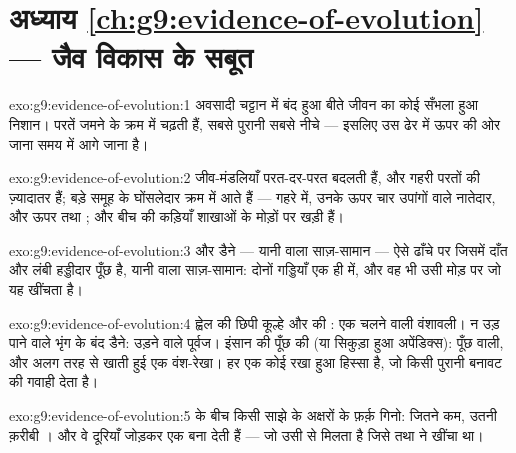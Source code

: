 \section*{अध्याय \ref{ch:g9:evidence-of-evolution} --- जैव विकास के सबूत}

\begin{solution}{exo:g9:evidence-of-evolution:1}
अवसादी चट्टान में बंद हुआ बीते जीवन का कोई सँभला हुआ निशान। परतें जमने के
क्रम में चढ़ती हैं, सबसे पुरानी सबसे नीचे --- इसलिए उस ढेर में ऊपर की ओर
जाना समय में आगे जाना है।
\end{solution}

\begin{solution}{exo:g9:evidence-of-evolution:2}
जीव-मंडलियाँ परत-दर-परत बदलती हैं, और गहरी परतों की ज़्यादातर 
 हैं; बड़े समूह  के घोंसलेदार क्रम में आते हैं --- 
गहरे में, उनके ऊपर चार उपांगों वाले नातेदार, और ऊपर  तथा ;
और बीच की कड़ियाँ शाखाओं के मोड़ों पर खड़ी हैं।
\end{solution}

\begin{solution}{exo:g9:evidence-of-evolution:3}
 और डैने --- यानी  वाला साज़-सामान --- ऐसे ढाँचे पर जिसमें दाँत
और लंबी हड्डीदार पूँछ है, यानी  वाला साज़-सामान: दोनों गड्डियाँ एक
ही  में, और वह भी उसी मोड़ पर जो यह  खींचता है।
\end{solution}

\begin{solution}{exo:g9:evidence-of-evolution:4}
ह्वेल की छिपी कूल्हे और  की : एक चलने वाली वंशावली। न उड़
पाने वाले भृंग के बंद डैने: उड़ने वाले पूर्वज। इंसान की पूँछ की  (या
सिकुड़ा हुआ अपेंडिक्स): पूँछ वाली, और अलग तरह से खाती हुई एक वंश-रेखा। हर
एक कोई रखा हुआ हिस्सा है, जो किसी पुरानी बनावट की गवाही देता है।
\end{solution}

\begin{solution}{exo:g9:evidence-of-evolution:5}
 के बीच किसी साझे  के अक्षरों के फ़र्क़ गिनो: जितने कम, उतनी
क़रीबी । और वे दूरियाँ जोड़कर एक  बना देती हैं --- जो उसी से
मिलता है जिसे  तथा  ने खींचा था।
\end{solution}


